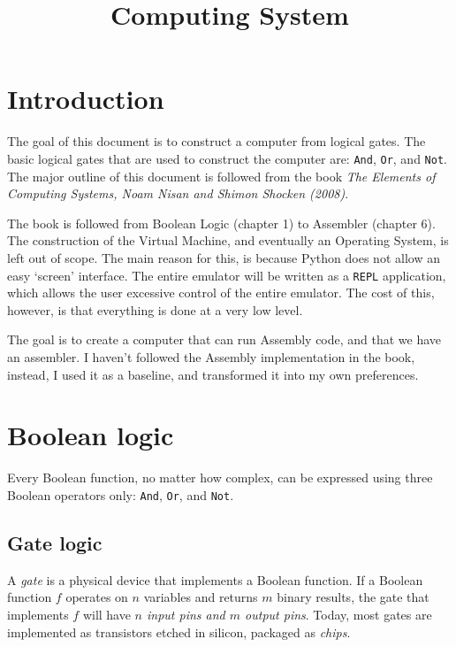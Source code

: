\documentclass[11pt]{article}
\title{Computing System}
\begin{document}
    
    
    \maketitle
    
    

    
    \hypertarget{introduction}{%
\section{Introduction}\label{introduction}}

    The goal of this document is to construct a computer from logical gates.
The basic logical gates that are used to construct the computer are:
\texttt{And}, \texttt{Or}, and \texttt{Not}. The major outline of this
document is followed from the book \emph{The Elements of Computing
Systems, Noam Nisan and Shimon Shocken (2008)}.

The book is followed from Boolean Logic (chapter 1) to Assembler
(chapter 6). The construction of the Virtual Machine, and eventually an
Operating System, is left out of scope. The main reason for this, is
because Python does not allow an easy `screen' interface. The entire
emulator will be written as a \texttt{REPL} application, which allows
the user excessive control of the entire emulator. The cost of this,
however, is that everything is done at a very low level.

The goal is to create a computer that can run Assembly code, and that we
have an assembler. I haven't followed the Assembly implementation in the
book, instead, I used it as a baseline, and transformed it into my own
preferences.

    \hypertarget{boolean-logic}{%
\section{Boolean logic}\label{boolean-logic}}

    Every Boolean function, no matter how complex, can be expressed using
three Boolean operators only: \texttt{And}, \texttt{Or}, and
\texttt{Not}.

    \hypertarget{gate-logic}{%
\subsection{Gate logic}\label{gate-logic}}

    A \emph{gate} is a physical device that implements a Boolean function.
If a Boolean function \(f\) operates on \(n\) variables and returns
\(m\) binary results, the gate that implements \(f\) will have
\emph{\(n\) input pins and \(m\) output pins}. Today, most gates are
implemented as transistors etched in silicon, packaged as \emph{chips}.
\end{document}
